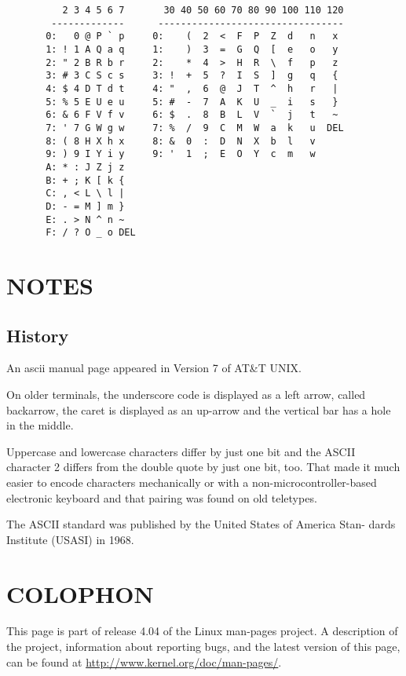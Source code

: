 \begin{verbatim}
          2 3 4 5 6 7       30 40 50 60 70 80 90 100 110 120
        -------------      ---------------------------------
       0:   0 @ P ` p     0:    (  2  <  F  P  Z  d   n   x
       1: ! 1 A Q a q     1:    )  3  =  G  Q  [  e   o   y
       2: " 2 B R b r     2:    *  4  >  H  R  \  f   p   z
       3: # 3 C S c s     3: !  +  5  ?  I  S  ]  g   q   {
       4: $ 4 D T d t     4: "  ,  6  @  J  T  ^  h   r   |
       5: % 5 E U e u     5: #  -  7  A  K  U  _  i   s   }
       6: & 6 F V f v     6: $  .  8  B  L  V  `  j   t   ~
       7: ' 7 G W g w     7: %  /  9  C  M  W  a  k   u  DEL
       8: ( 8 H X h x     8: &  0  :  D  N  X  b  l   v
       9: ) 9 I Y i y     9: '  1  ;  E  O  Y  c  m   w
       A: * : J Z j z
       B: + ; K [ k {
       C: , < L \ l |
       D: - = M ] m }
       E: . > N ^ n ~
       F: / ? O _ o DEL
\end{verbatim}

\section{NOTES}
\subsection{History}

       An ascii manual page appeared in Version 7 of AT\&T UNIX.

       On older terminals, the underscore code is displayed as a  left  arrow,
       called  backarrow, the caret is displayed as an up-arrow and the 
vertical bar has a hole in the middle.

       Uppercase and lowercase characters differ by just one bit and the ASCII
       character  2  differs from the double quote by just one bit, too.  That
       made it much easier to encode characters mechanically or  with  a  
non-microcontroller-based electronic keyboard and that pairing was found on
       old teletypes.

       The ASCII standard was published by the United States of America  Stan-
       dards Institute (USASI) in 1968.

\section{COLOPHON}

       This page is part of release 4.04 of the Linux  man-pages  project.   A
       description  of  the project, information about reporting bugs, and the
       latest    version    of    this    page,    can     be     found     at
       \url{http://www.kernel.org/doc/man-pages/}.
